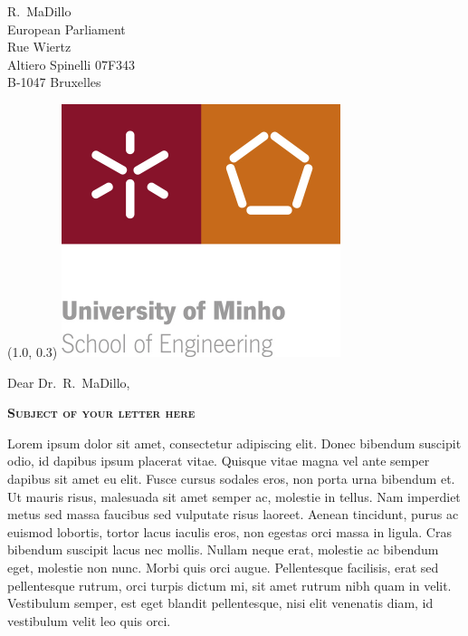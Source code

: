 \documentclass[a4paper,12pt]{letter}
\date{February 31, 2013}
\begin{document}
\begin{letter}{
	R.\ MaDillo\\
	European Parliament\\
	Rue Wiertz\\
	Altiero Spinelli 07F343\\
	B-1047 Bruxelles 
}

\begin{textblock}{10}(1.0, 0.3)
	\includegraphics{logo}
\end{textblock}

\opening{Dear Dr.\ R.\ MaDillo,}
{
\begin{center}
	\textbf{\textsc{Subject of your letter here}}\\[2em]
\end{center}
}

% 
%
%

	Lorem ipsum dolor sit amet, consectetur adipiscing elit. Donec bibendum 
	suscipit odio, id dapibus ipsum placerat vitae. Quisque vitae magna vel ante 
	semper dapibus sit amet eu elit. Fusce cursus sodales eros, non porta urna 
	bibendum et. Ut mauris risus, malesuada sit amet semper ac, molestie in 
	tellus. Nam imperdiet metus sed massa faucibus sed vulputate risus laoreet. 
	Aenean tincidunt, purus ac euismod lobortis, tortor lacus iaculis eros, non 
	egestas orci massa in ligula. Cras bibendum suscipit lacus nec mollis. Nullam 
	neque erat, molestie ac bibendum eget, molestie non nunc. Morbi quis orci 
	augue. Pellentesque facilisis, erat sed pellentesque rutrum, orci turpis 
	dictum mi, sit amet rutrum nibh quam in velit. Vestibulum semper, est eget 
	blandit pellentesque, nisi elit venenatis diam, id vestibulum velit leo quis 
	orci. 


\end{letter}
\end{document}
